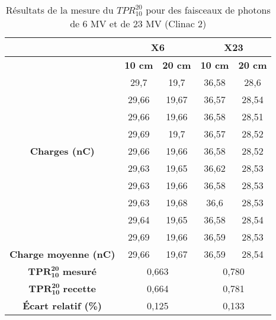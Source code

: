 \documentclass{article}
\begin{document}
\begin{table}[h]
  \centering
  \begin{tabular}{c|cc|cc|}
  \cline{2-5}
                                                                                     & \multicolumn{2}{c|}{\textbf{X6}} & \multicolumn{2}{c|}{\textbf{X23}} \\ \hline
  \multicolumn{1}{|c|}{\multirow{11}{*}{\textbf{Charges (nC)}}}                      & \textbf{10 cm}           & \textbf{20 cm}          & \textbf{10 cm}           & \textbf{20 cm}           \\ \cline{2-5} 
  \multicolumn{1}{|c|}{} & 29,7  & 19,7  & 36,58 & 28,6  \\
  \multicolumn{1}{|c|}{} & 29,66 & 19,67 & 36,57 & 28,54 \\
  \multicolumn{1}{|c|}{} & 29,66 & 19,66 & 36,58 & 28,51 \\
  \multicolumn{1}{|c|}{} & 29,69 & 19,7  & 36,57 & 28,52 \\
  \multicolumn{1}{|c|}{} & 29,66 & 19,66 & 36,58 & 28,52 \\
  \multicolumn{1}{|c|}{} & 29,63 & 19,65 & 36,62 & 28,53 \\
  \multicolumn{1}{|c|}{} & 29,63 & 19,66 & 36,58 & 28,53 \\
  \multicolumn{1}{|c|}{} & 29,63 & 19,68 & 36,6  & 28,53 \\
  \multicolumn{1}{|c|}{} & 29,64 & 19,65 & 36,58 & 28,54 \\
  \multicolumn{1}{|c|}{} & 29,69 & 19,66 & 36,59 & 28,53 \\
  \hline
  \multicolumn{1}{|c|}{\textbf{Charge moyenne   (nC)}}                               & 29,66           & 19,67          & 36,59           & 28,54           \\
  \hline
  \multicolumn{1}{|c|}{$\mathbf{TPR^{20}_{10}}$ \textbf{mesuré}}  & \multicolumn{2}{c|}{0,663}       & \multicolumn{2}{c|}{0,780}        \\
  \multicolumn{1}{|c|}{$\mathbf{TPR^{20}_{10}}$ \textbf{recette}} & \multicolumn{2}{c|}{0,664}       & \multicolumn{2}{c|}{0,781}        \\
  \multicolumn{1}{|c|}{\textbf{Écart relatif (\%)}}                                           & \multicolumn{2}{c|}{0,125}       & \multicolumn{2}{c|}{0,133}        \\ \hline
  \end{tabular}
  \caption{Résultats de la mesure du $TPR^{20}_{10}$ pour des faisceaux de photons de 6 MV et de 23 MV (Clinac 2)}
  \label{table_resultats_tpr}
\end{table}
\end{document}

